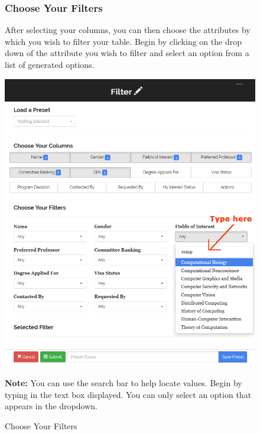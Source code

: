 \documentclass[fontsize=12pt,paper=letter,twoside]{scrartcl}
\begin{document}
\begin{figure}[!htb]
\subsubsection{Choose Your Filters}
After selecting your columns, you can then choose the attributes by which you wish to filter your table. Begin by clicking on the drop down of the attribute you wish to filter and select an option from a list of generated options.
\begin{center}
\includegraphics[width=.99\textwidth]{images/prof/choose_filters.png}
\end{center}
\caption{Choose Your Filters}
\textbf{Note:} You can use the search bar to help locate values. Begin by typing in the text box displayed. You can only select an option that appears in the dropdown.
\label{fig:prof/choose_filters}
\end{figure}
\end{document}
